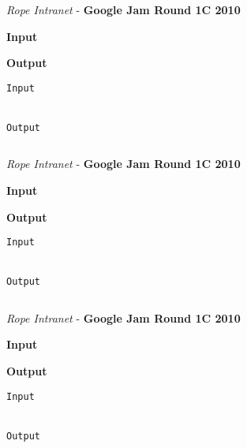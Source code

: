 \begin{problem}{\textit{Rope Intranet} - \textbf{Google Jam Round 1C 2010}}




\textbf{Input}


\textbf{Output}


\begin{framed}
	\begin{verbatim}
Input 


Output 

	\end{verbatim}
\end{framed}

\end{problem}

\begin{solution}
	
	\begin{lstlisting}[language=c++, caption="Store credit c++ solution"]


	\end{lstlisting}
\end{solution}



\begin{problem}{\textit{Rope Intranet} - \textbf{Google Jam Round 1C 2010}}




\textbf{Input}


\textbf{Output}


\begin{framed}
	\begin{verbatim}
Input 


Output 

	\end{verbatim}
\end{framed}

\end{problem}

\begin{solution}
	
	\begin{lstlisting}[language=c++, caption="Store credit c++ solution"]


	\end{lstlisting}
\end{solution}



\begin{problem}{\textit{Rope Intranet} - \textbf{Google Jam Round 1C 2010}}




\textbf{Input}


\textbf{Output}


\begin{framed}
	\begin{verbatim}
Input 


Output 

	\end{verbatim}
\end{framed}

\end{problem}

\begin{solution}
	
	\begin{lstlisting}[language=c++, caption="Store credit c++ solution"]


	\end{lstlisting}
\end{solution}